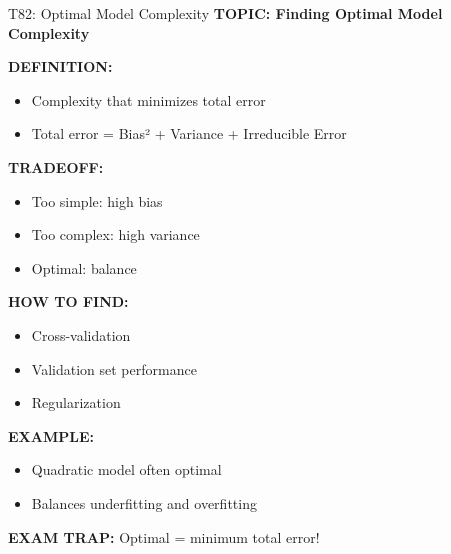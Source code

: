 \documentclass[8pt]{beamer}
\begin{document}
	\begin{frame}{T82: Optimal Model Complexity}
		\fontsize{6.5}{7.5}\selectfont
		\textbf{TOPIC: Finding Optimal Model Complexity}
		
		\vspace{0.1cm}
		\textbf{DEFINITION:}
		\begin{itemize}
			\item Complexity that minimizes total error
			\item Total error = Bias² + Variance + Irreducible Error
		\end{itemize}
		
		\vspace{0.1cm}
		\textbf{TRADEOFF:}
		\begin{itemize}
			\item Too simple: high bias
			\item Too complex: high variance
			\item Optimal: balance
		\end{itemize}
		
		\vspace{0.1cm}
		\textbf{HOW TO FIND:}
		\begin{itemize}
			\item Cross-validation
			\item Validation set performance
			\item Regularization
		\end{itemize}
		
		\vspace{0.1cm}
		\textbf{EXAMPLE:}
		\begin{itemize}
			\item Quadratic model often optimal
			\item Balances underfitting and overfitting
		\end{itemize}
		
		\textcolor{myred}{\textbf{EXAM TRAP:}} Optimal = \textcolor{myblue}{minimum total error}!
	\end{frame}
	
\end{document}
